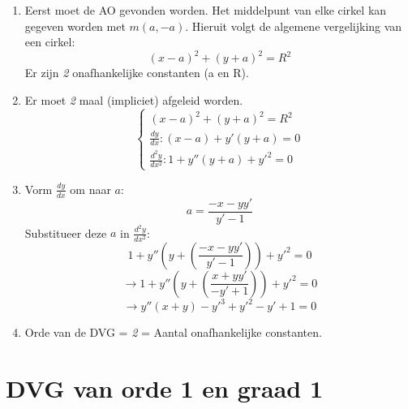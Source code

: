 {
\begin{enumerate}
\item Eerst moet de AO gevonden worden. Het middelpunt van elke cirkel kan gegeven worden met $m(a, -a).$
    Hieruit volgt de algemene vergelijking van een cirkel: $$(x - a)^2 + (y + a)^2 = R^2$$
    Er zijn \textit{2} onafhankelijke constanten (a en R).
\item Er moet \textit{2} maal (impliciet) afgeleid worden.
\[
    \begin{cases}
    (x - a)^2 + (y + a)^2 = R^2 \\
    \frac{dy}{dx} : (x-a) + y'(y+a) = 0 \\
    \frac{d^2y}{dx^2} : 1 + y''(y + a) + y'^2 = 0
    \end{cases}
\]
\item
    Vorm $\frac{dy}{dx}$ om naar $a$:
    $$a = \frac{-x - yy'}{y' - 1}$$
    Substitueer deze $a$ in $\frac{d^2y}{dx^2}$:
    $$1 + y''(y + (\frac{-x - yy'}{y' - 1})) + y'^2 = 0$$
    $$\rightarrow 1 + y''(y + (\frac{x + yy'}{-y' + 1})) + y'^2 = 0$$
    $$\rightarrow y''(x + y) - y'^3 + y'^2 - y' + 1 = 0$$
\item Orde van de DVG = \textit{2}  = Aantal onafhankelijke constanten.
\end{enumerate}
}
\section{DVG van orde 1 en graad 1}
